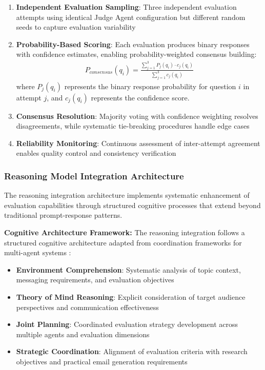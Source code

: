 \begin{enumerate}
    \item \textbf{Independent Evaluation Sampling}: Three independent evaluation attempts using identical Judge Agent configuration but different random seeds to capture evaluation variability
    
    \item \textbf{Probability-Based Scoring}: Each evaluation produces binary responses with confidence estimates, enabling probability-weighted consensus building:
    \begin{align}
    P_{consensus}(q_i) = \frac{\sum_{j=1}^{3} P_j(q_i) \cdot c_j(q_i)}{\sum_{j=1}^{3} c_j(q_i)}
    \end{align}
    where $P_j(q_i)$ represents the binary response probability for question $i$ in attempt $j$, and $c_j(q_i)$ represents the confidence score.
    
    \item \textbf{Consensus Resolution}: Majority voting with confidence weighting resolves disagreements, while systematic tie-breaking procedures handle edge cases
    
    \item \textbf{Reliability Monitoring}: Continuous assessment of inter-attempt agreement enables quality control and consistency verification
\end{enumerate}

\subsubsection{Reasoning Model Integration Architecture}

The reasoning integration architecture implements systematic enhancement of evaluation capabilities through structured cognitive processes that extend beyond traditional prompt-response patterns.

\textbf{Cognitive Architecture Framework:}
The reasoning integration follows a structured cognitive architecture adapted from coordination frameworks for multi-agent systems \cite{jin2025multiagent_scaling, agashe2023llm_coordination}:

\begin{itemize}
    \item \textbf{Environment Comprehension}: Systematic analysis of topic context, messaging requirements, and evaluation objectives
    \item \textbf{Theory of Mind Reasoning}: Explicit consideration of target audience perspectives and communication effectiveness
    \item \textbf{Joint Planning}: Coordinated evaluation strategy development across multiple agents and evaluation dimensions
    \item \textbf{Strategic Coordination}: Alignment of evaluation criteria with research objectives and practical email generation requirements
\end{itemize}

